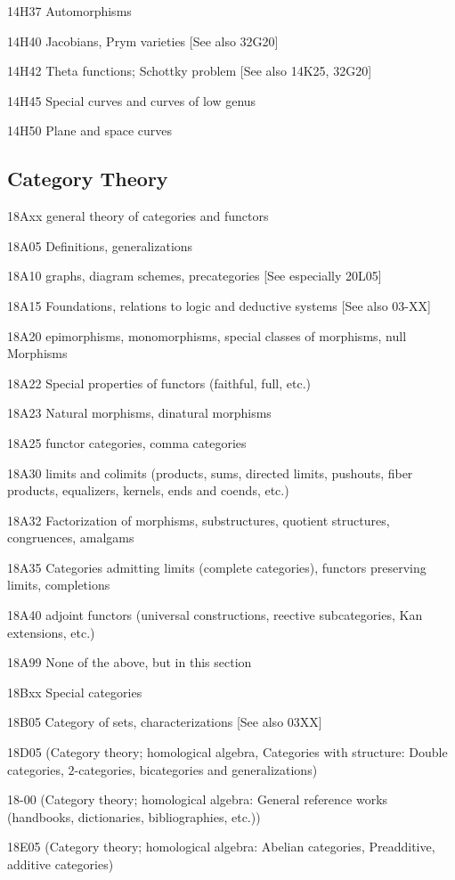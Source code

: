 \documentclass[12pt]{article}
\theoremstyle{plain}
\theoremstyle{definition}
\numberwithin{equation}{section}
\begin{document}
{14H37 Automorphisms

14H40 Jacobians, Prym varieties [See also 32G20]

14H42 Theta functions; Schottky problem [See also 14K25, 32G20]

14H45 Special curves and curves of low genus

14H50 Plane and space curves


\subsection{Category Theory}

18Axx general theory of categories and functors 

18A05 Definitions, generalizations 

18A10 graphs, diagram schemes, precategories [See especially 20L05]

18A15 Foundations, relations to logic and deductive systems [See also 03-XX]

18A20 epimorphisms, monomorphisms, special classes of morphisms, null Morphisms

18A22 Special properties of functors (faithful, full, etc.)

18A23 Natural morphisms, dinatural morphisms

18A25 functor categories, comma categories

18A30 limits and colimits (products, sums, directed limits, pushouts, fiber products, equalizers, kernels, ends and coends, etc.)

18A32 Factorization of morphisms, substructures, quotient structures, congruences, amalgams

18A35 Categories admitting limits (complete categories), functors preserving limits, completions

18A40 adjoint functors (universal constructions, reective subcategories, Kan extensions, etc.)

18A99 None of the above, but in this section

18Bxx Special categories

18B05 Category of sets, characterizations [See also 03XX]

18D05 (Category theory; homological algebra, Categories with structure: Double categories, $2$-categories, bicategories and generalizations)

18-00 (Category theory; homological algebra: General reference works (handbooks, dictionaries, bibliographies, etc.))

18E05 (Category theory; homological algebra: Abelian categories, Preadditive, additive categories)


}
\end{document}

